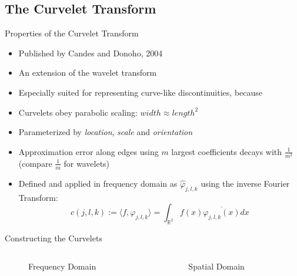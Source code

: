 \documentclass[mathserif]{beamer}
\begin{document}
\subsection{The Curvelet Transform}
\begin{frame}{Properties of the Curvelet Transform}
    \begin{itemize}
        \item Published by Candes and Donoho, 2004
        \item An extension of the wavelet transform
        \item Especially suited for representing curve-like discontinuities, because
        \item Curvelets obey parabolic scaling: $width \approx length^2$
        \item Parameterized by \emph{location}, \emph{scale} and \emph{orientation}
        \item Approximation error along edges using $m$ largest coefficients decays with $\frac{1}{m^2}$ (compare $\frac{1}{m}$ for wavelets)
        \item Defined and applied in frequency domain as $\hat{\varphi}_{j, l, k}$ using the inverse Fourier Transform:
            \begin{equation*}
                c(j, l, k) := \langle f, \varphi_{j, l, k} \rangle = \int_{\mathbb{R}^2} f(x) \overline{\varphi_{j, l, k}(x)} dx
            \end{equation*}
    \end{itemize}
\end{frame}

\begin{frame}{Constructing the Curvelets}
    \begin{columns}
        \begin{column}{.5\textwidth}
            \begin{figure}
                
                \caption{Frequency Domain}
            \end{figure}
        \end{column}
        \begin{column}{.5\textwidth}
            \begin{figure}
                
                \caption{Spatial Domain}
            \end{figure}
        \end{column}
    \end{columns}
\end{frame}
\end{document}
